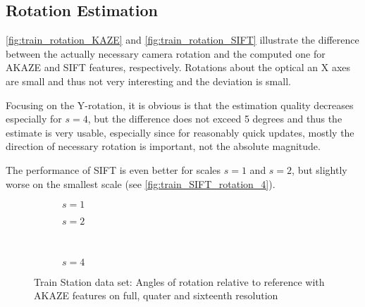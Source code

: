 \subsection{Rotation Estimation}

\autoref{fig:train_rotation_KAZE} and \autoref{fig:train_rotation_SIFT} illustrate the
difference between the actually necessary camera rotation and the computed one
for AKAZE and SIFT features, respectively. Rotations about the optical an X axes
are small and thus not very interesting and the deviation is small. 

Focusing on the Y-rotation, it is obvious is that the estimation
quality decreases especially for $s=4$, but the difference does not exceed 5
degrees and thus the estimate is very usable, especially since for reasonably
quick updates, mostly the direction of necessary rotation is important, not the
absolute magnitude.

The performance of SIFT is even better for scales $s=1$ and $s=2$, but slightly
worse on the smallest scale (see \autoref{fig:train_SIFT_rotation_4}).

\begin{figure}[h]
   \begin{subfigure}{.5\linewidth}
      \centering      
      
      \caption{$s=1$}
      \label{fig:train_KAZE_rotation_1}
   \end{subfigure}
   \quad
   \begin{subfigure}{.5\linewidth}
      \centering      
      
      \caption{$s=2$}
      \label{fig:train_KAZE_rotation_2}
   \end{subfigure}\\[3ex]
   \begin{subfigure}{\linewidth}
      \centering      
      
      \caption{$s=4$}
      \label{fig:train_KAZE_rotation_4}
   \end{subfigure}
   \caption[Train data: Rotation AKAZE]{Train Station data set: Angles of rotation relative to reference with
   AKAZE features on full, quater and sixteenth resolution}
   \label{fig:train_rotation_KAZE}
\end{figure}

